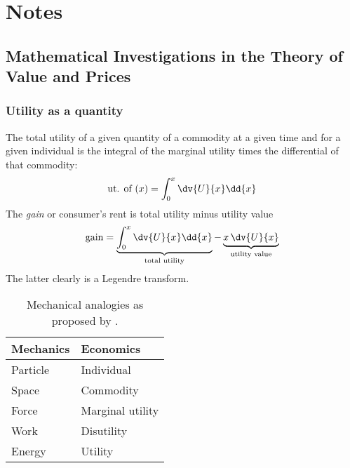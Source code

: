 \chapter{Notes}

\section{Mathematical Investigations in the Theory of Value and Prices}
\subsection*{Utility as a quantity}
The total utility of a given quantity of a commodity at a given time and for a given individual is the integral of the marginal utility times the differential of that commodity:
$$ \text{ut. of }(x) = \int^x_0 \dv{U}{x}\dd{x} $$
The \emph{gain} or consumer's rent is total utility minus utility value
$$ \text{gain} = \underbrace{\int^x_0 \dv{U}{x}\dd{x}}_{\text{total utility}} - \underbrace{x\,\dv{U}{x}}_{\text{utility value}} $$
The latter clearly is a Legendre transform.
\begin{table}[h]
    \centering
    \caption{Mechanical analogies as proposed by \citet{Fisher1892}.}
    \begin{tabular}{ll}
    \toprule
        \textbf{Mechanics} &  \textbf{Economics}\\
    \midrule
         Particle & Individual \\
         Space & Commodity \\
         Force & Marginal utility \\
         Work & Disutility \\
         Energy & Utility \\
    \bottomrule
    \end{tabular}
\end{table}

